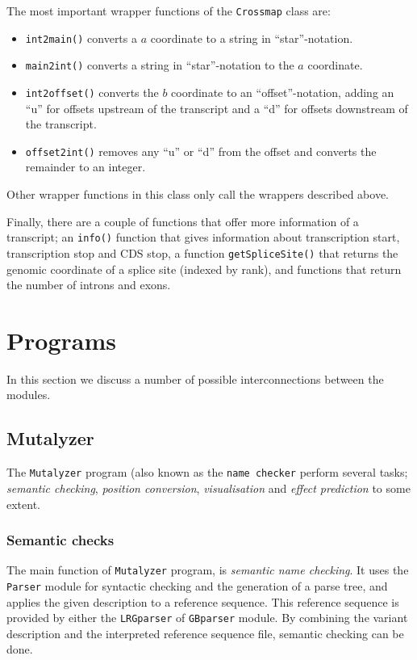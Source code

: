 \documentclass{article}
\begin{document}
The most important wrapper functions of the \texttt{Crossmap} class are:
\begin{itemize}
\item \texttt{int2main()} converts a $a$ coordinate to a string in
      ``star''-notation.
\item \texttt{main2int()} converts a string in ``star''-notation to the $a$ 
      coordinate.
\item \texttt{int2offset()} converts the $b$ coordinate to an
      ``offset''-notation, adding an ``u'' for offsets upstream of the
      transcript and a ``d'' for offsets downstream of the transcript.
\item \texttt{offset2int()} removes any ``u'' or ``d'' from the offset and
      converts the remainder to an integer.
\end{itemize}

Other wrapper functions in this class only call the wrappers described above.

Finally, there are a couple of functions that offer more information of a 
transcript; an \texttt{info()} function that gives information about
transcription start, transcription stop and CDS stop, a function
\texttt{getSpliceSite()} that returns the genomic coordinate of a splice site
(indexed by rank), and functions that return the number of introns and exons.

\newpage

\section{Programs} \label{sec:programs}
In this section we discuss a number of possible interconnections between the
modules.

\subsection{Mutalyzer} \label{subsec:mutalyzer}
The \texttt{Mutalyzer} program (also known as the \texttt{name checker} perform
several tasks; \emph{semantic checking}, \emph{position conversion},
\emph{visualisation} and \emph{effect prediction} to some extent. 

\subsubsection{Semantic checks}
The main function of \texttt{Mutalyzer} program, is \emph{semantic name
checking}. It uses the \texttt{Parser} module for syntactic checking and the
generation of a parse tree, and applies the given description to a reference 
sequence. This reference sequence is provided by either the \texttt{LRGparser}
of \texttt{GBparser} module. By combining the variant description and the
interpreted reference sequence file, semantic checking can be done.
\end{document}
